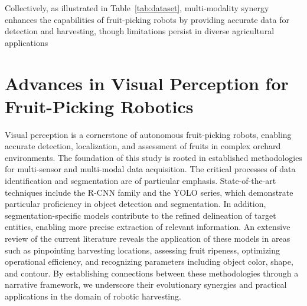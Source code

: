 \documentclass[a4paper,fleqn]{cas-dc}
\begin{document}
Collectively, as illustrated in Table~\ref{tab:dataset}, multi-modality synergy enhances the capabilities of fruit-picking robots by providing accurate data for detection and harvesting, though limitations persist in diverse agricultural applications

\section{Advances in Visual Perception for Fruit-Picking Robotics}
Visual perception is a cornerstone of autonomous fruit-picking robots, enabling accurate detection, localization, and assessment of fruits in complex orchard environments. 
The foundation of this study is rooted in established methodologies for multi-sensor and multi-modal data acquisition. The critical processes of data identification and segmentation are of particular emphasis.
State-of-the-art techniques include the R-CNN family and the YOLO series, which demonstrate particular proficiency in object detection and segmentation.
In addition, segmentation-specific models contribute to the refined delineation of target entities, enabling more precise extraction of relevant information. An extensive review of the current literature reveals the application of these models in areas such as pinpointing harvesting locations, assessing fruit ripeness, optimizing operational efficiency, and recognizing parameters including object color, shape, and contour.
By establishing connections between these methodologies through a narrative framework, we underscore their evolutionary synergies and practical applications in the domain of robotic harvesting.
\end{document}
